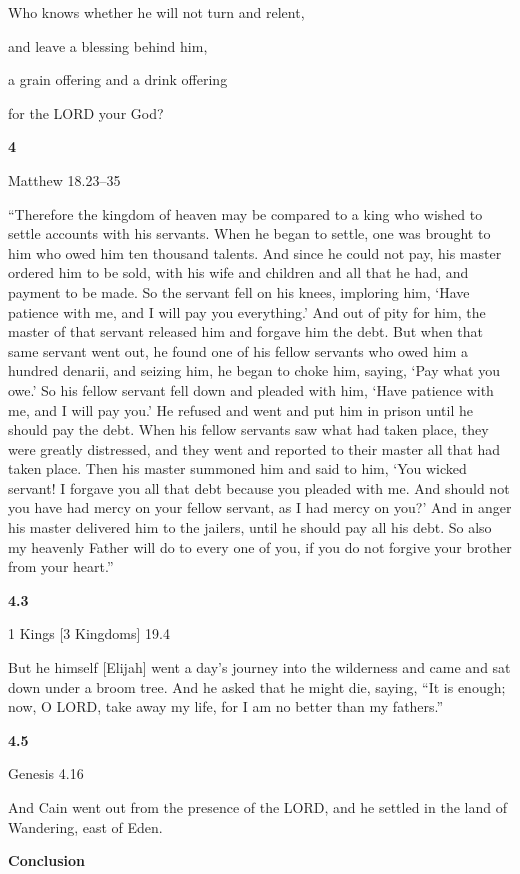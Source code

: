 \documentclass[
]{article}
\newcommand{\RL}[1]{\beginR #1\endR}
\begin{document}
Who knows whether he will not turn and relent,

and leave a blessing behind him,

a grain offering and a drink offering

for the LORD your God?

\textbf{4}

Matthew 18.23--35

\RL{``}Therefore the kingdom of heaven may be compared to a king who
wished to settle accounts with his servants. When he began to settle,
one was brought to him who owed him ten thousand talents. And since he
could not pay, his master ordered him to be sold, with his wife and
children and all that he had, and payment to be made. So the servant
fell on his knees, imploring him, \RL{`}Have patience with me, and I
will pay you everything.\RL{'} And out of pity for him, the master of
that servant released him and forgave him the debt. But when that same
servant went out, he found one of his fellow servants who owed him a
hundred denarii, and seizing him, he began to choke him, saying,
\RL{`}Pay what you owe.\RL{'} So his fellow servant fell down and
pleaded with him, \RL{`}Have patience with me, and I will pay you.\RL{'}
He refused and went and put him in prison until he should pay the debt.
When his fellow servants saw what had taken place, they were greatly
distressed, and they went and reported to their master all that had
taken place. Then his master summoned him and said to him, \RL{`}You
wicked servant! I forgave you all that debt because you pleaded with me.
And should not you have had mercy on your fellow servant, as I had mercy
on you?\RL{'} And in anger his master delivered him to the jailers,
until he should pay all his debt. So also my heavenly Father will do to
every one of you, if you do not forgive your brother from your heart.''

\textbf{4.3}

1 Kings {[}3 Kingdoms{]} 19.4

But he himself {[}Elijah{]} went a day\RL{'}s journey into the
wilderness and came and sat down under a broom tree. And he asked that
he might die, saying, \RL{``}It is enough; now, O LORD, take away my
life, for I am no better than my fathers.''

\textbf{4.5}

Genesis 4.16

And Cain went out from the presence of the LORD, and he settled in the
land of Wandering, east of Eden.

\textbf{Conclusion}
\end{document}
